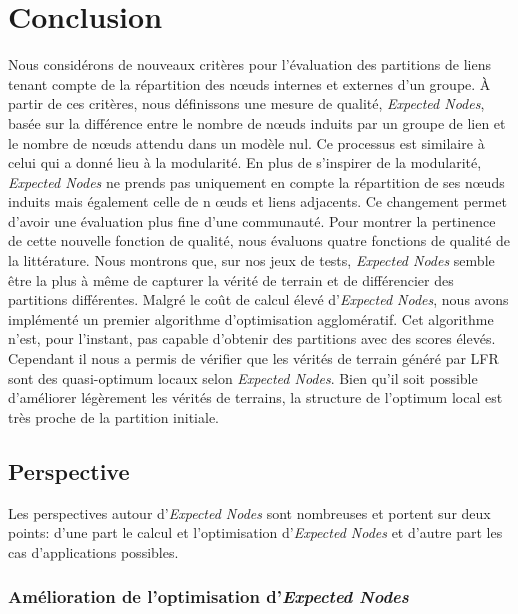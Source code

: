 \section{Conclusion}

Nous considérons de nouveaux critères pour l'évaluation des partitions de liens tenant compte de la répartition des n\oe uds internes et externes d'un groupe.
\`A partir de ces critères, nous définissons une mesure de qualité, \emph{Expected Nodes}, basée sur la différence entre le nombre de n\oe uds induits par un groupe de lien et le nombre de n\oe uds attendu dans un modèle nul.
Ce processus est similaire à celui qui a donné lieu à la modularité.
En plus de s'inspirer de la modularité, \emph{Expected Nodes} ne prends pas uniquement en compte la répartition de ses n\oe uds induits mais également celle de n \oe uds et liens adjacents.
Ce changement permet d'avoir une évaluation plus fine d'une communauté.
Pour montrer la pertinence de cette nouvelle fonction de qualité, nous évaluons quatre fonctions de qualité de la littérature.
Nous montrons que, sur nos jeux de tests, \emph{Expected Nodes} semble être la plus à même de capturer la vérité de terrain et de différencier des partitions différentes.
Malgré le coût de calcul élevé d'\emph{Expected Nodes}, nous avons implémenté un premier algorithme d'optimisation agglomératif.
Cet algorithme n'est, pour l'instant, pas capable d'obtenir des partitions avec des scores élevés.
Cependant il nous a permis de vérifier que les vérités de terrain généré par LFR sont des quasi-optimum locaux selon \emph{Expected Nodes}.
Bien qu'il soit possible d'améliorer légèrement les vérités de terrains, la structure de l'optimum local est très proche de la partition initiale.


\subsection{Perspective}

Les perspectives autour d'\emph{Expected Nodes} sont nombreuses et portent sur deux points: d'une part le calcul et l'optimisation d'\emph{Expected Nodes} et d'autre part les cas d'applications possibles.

\subsubsection{Amélioration de l'optimisation d'\emph{Expected Nodes}}

